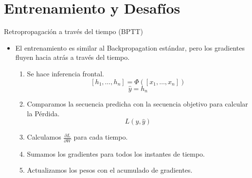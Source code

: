 \documentclass[aspectratio=169]{beamer}
\begin{document}
	
	
	
	
	
	
	
	
	\section{Entrenamiento y Desafíos}
	
	\begin{frame}{Retropropagación a través del tiempo (BPTT)}
		\begin{itemize}
			\item El entrenamiento es similar al Backpropagation estándar, pero los gradientes fluyen hacia atrás a través del tiempo.
			\begin{enumerate}
				\item Se hace inferencia frontal.
					$$[h_1, \dots, h_n] = \Phi([x_1,\dots,x_n])$$
					$$\hat{y} = h_n$$
				\item Comparamos la secuencia predicha con la secuencia objetivo para calcular la Pérdida.
				$$ L(y, \hat{y})$$
				\item Calculamos $\frac{\partial L}{\partial W}$ para cada tiempo. 
				\item Sumamos los gradientes para todos los instantes de tiempo.
				\item Actualizamos los pesos con el acumulado de gradientes.
			\end{enumerate}
		\end{itemize}
		
	\end{frame}
	
\end{document}
